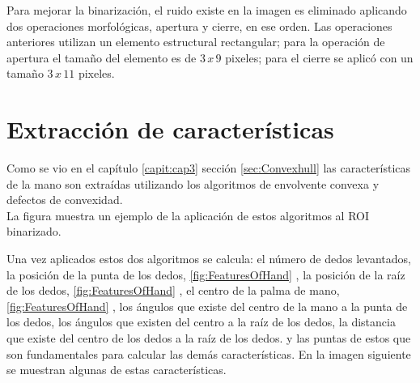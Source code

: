 Para mejorar la binarizaci\'on, el ruido existe en la imagen es eliminado aplicando dos operaciones morfológicas, apertura y cierre, en ese orden. Las operaciones anteriores utilizan un elemento estructural rectangular; para la operación de apertura el tamaño del elemento es de $3 \, x \, 9$ pixeles; para el cierre se aplic\'o con un tamaño  $3\, x \, 11$ pixeles.



\section{Extracción de características}\label{sec:ExtraccionCaracteristicasSystem}

Como se vio en el capítulo \ref{capit:cap3} sección \ref{sec:Convexhull} las características de la mano son extraídas utilizando los algoritmos de envolvente convexa y  defectos de convexidad.\\
La figura muestra un ejemplo de la aplicación de estos algoritmos al ROI binarizado.  



Una vez aplicados estos dos algoritmos se calcula: el número de dedos levantados, la posición de la punta de los dedos, \ref{fig:FeaturesOfHand} , la posición de la raíz de los dedos, \ref{fig:FeaturesOfHand} , el centro de la palma de mano, \ref{fig:FeaturesOfHand} , los ángulos que existe del centro de la mano a la punta de los dedos, los ángulos que existen del centro a la raíz de los dedos, la distancia que existe del centro de los dedos a la raíz de los dedos. y las puntas de estos que son fundamentales para calcular las demás características. En la imagen siguiente se muestran algunas de estas características.  

